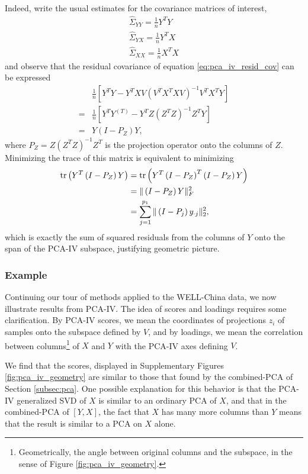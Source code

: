 \documentclass{article}
\begin{document}
Indeed, write the usual estimates for the covariance matrices of interest,
\begin{align*}
  \hat{\Sigma}_{YY} = \frac{1}{n}Y^{T}Y \\
  \hat{\Sigma}_{YX} = \frac{1}{n}Y^{T}X \\
  \hat{\Sigma}_{XX} = \frac{1}{n}X^{T}X
\end{align*}
and observe that the residual covariance of equation \ref{eq:pca_iv_resid_cov}
can be expressed
\begin{align*}
  &\frac{1}{n}\left[Y^{T}Y -
    Y^{T}XV\left(V^{T}X^{T}XV\right)^{-1}V^{T}X^{T}Y\right] \\
  = &\frac{1}{n}\left[Y^{T}Y^{(T)} - Y^{T}Z\left(Z^{T}Z\right)^{-1}Z^{T}Y\right] \\
  = &Y\left(I - P_{Z}\right)Y,
\end{align*}
where $P_{Z} = Z\left(Z^{T}Z\right)^{-1}Z^{T}$ is the projection operator onto
the columns of $Z$. Minimizing the trace of this matrix is equivalent to
minimizing
\begin{align*}
  \mathop\mathrm{tr}\left(Y^{T}\left(I - P_{Z}\right)Y\right) &=
  \mathop\mathrm{tr}\left(Y^{T}\left(I - P_{Z}\right)^{T}\left(I -
      P_{Z}\right)Y\right) \\
  &= \|\left(I - P_{Z}\right)Y\|_{F}^{2} \\
  &= \sum_{j = 1}^{p_{1}}\|\left(I - P_{j}\right)y_{\cdot j}\|^{2}_{2},
\end{align*}
which is exactly the sum of squared residuals from the columns of $Y$ onto the
span of the PCA-IV subspace, justifying geometric picture.

\subsubsection{Example}
\label{subsec:pcaiv_example}

Continuing our tour of methods applied to the WELL-China data, we now illustrate
results from PCA-IV. The idea of scores and loadings requires some
clarification. By PCA-IV scores, we mean the coordinates of projections $z_{i}$
of samples onto the subspace defined by $V$, and by loadings, we mean the
correlation between columns\footnote{Geometrically, the angle between original
  columns and the subspace, in the sense of Figure \ref{fig:pca_iv_geometry}.}
of $X$ and $Y$ with the PCA-IV axes defining $V$.

We find that the scores, displayed in Supplementary Figures
\ref{fig:pca_iv_geometry} are similar to those that found by the combined-PCA of
Section \ref{subsec:pca}. One possible explanation for this behavior is that the
PCA-IV generalized SVD of $X$ is similar to an ordinary PCA of $X$, and that in
the combined-PCA of $\left[Y, X\right]$, the fact that $X$ has many more columns
than $Y$ means that the result is similar to a PCA on $X$ alone.
\end{document}
